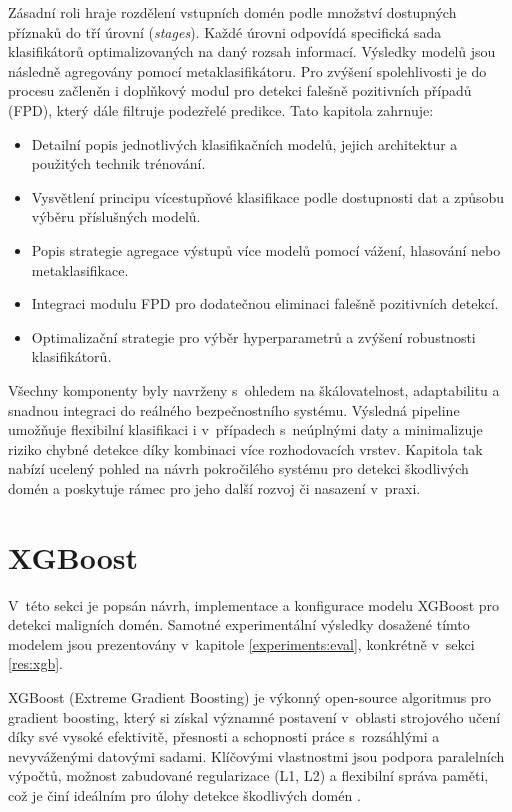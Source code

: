 Zásadní roli hraje rozdělení vstupních domén podle množství dostupných příznaků do tří úrovní (\textit{stages}). Každé úrovni odpovídá specifická sada klasifikátorů optimalizovaných na daný rozsah informací. Výsledky modelů jsou následně agregovány pomocí metaklasifikátoru. Pro zvýšení spolehlivosti je do procesu začleněn i doplňkový modul pro detekci falešně pozitivních případů (FPD), který dále filtruje podezřelé predikce. Tato kapitola zahrnuje:
\begin{itemize}
    \item Detailní popis jednotlivých klasifikačních modelů, jejich architektur a použitých technik trénování.
    \item Vysvětlení principu vícestupňové klasifikace podle dostupnosti dat a způsobu výběru příslušných modelů.
    \item Popis strategie agregace výstupů více modelů pomocí vážení, hlasování nebo metaklasifikace.
    \item Integraci modulu FPD pro dodatečnou eliminaci falešně pozitivních detekcí.
    \item Optimalizační strategie pro výběr hyperparametrů a zvýšení robustnosti klasifikátorů.
\end{itemize}

\noindent Všechny komponenty byly navrženy s~ohledem na škálovatelnost, adaptabilitu a snadnou integraci do reálného bezpečnostního systému. Výsledná pipeline umožňuje flexibilní klasifikaci i v~případech s~neúplnými daty a minimalizuje riziko chybné detekce díky kombinaci více rozhodovacích vrstev. Kapitola tak nabízí ucelený pohled na návrh pokročilého systému pro detekci škodlivých domén a poskytuje rámec pro jeho další rozvoj či nasazení v~praxi.

\section{XGBoost}

V~této sekci je popsán návrh, implementace a konfigurace modelu XGBoost pro detekci maligních domén. Samotné experimentální výsledky dosažené tímto modelem jsou prezentovány v~kapitole \ref{experiments:eval}, konkrétně v~sekci \ref{res:xgb}.

XGBoost (Extreme Gradient Boosting) je výkonný open-source algoritmus pro gradient boosting, který si získal významné postavení v~oblasti strojového učení díky své vysoké efektivitě, přesnosti a schopnosti práce s~rozsáhlými a nevyváženými datovými sadami. Klíčovými vlastnostmi jsou podpora paralelních výpočtů, možnost zabudované regularizace (L1, L2) a flexibilní správa paměti, což je činí ideálním pro úlohy detekce škodlivých domén \cite{chen2016xgboost}. 


